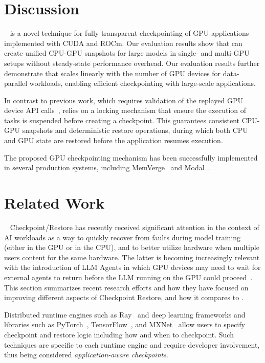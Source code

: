 
\section{Discussion}~\label{sec:discussion}%
\sys is a novel technique for fully transparent checkpointing of GPU applications implemented with CUDA and ROCm. Our evaluation results show that \sys can create unified CPU-GPU snapshots for large models in single- and multi-GPU setups without steady-state performance overhead. Our evaluation results further demonstrate that \sys scales linearly with the number of GPU devices for data-parallel workloads, enabling efficient checkpointing with large-scale applications.

In contrast to previous work, which requires validation of the replayed GPU device API calls~\cite{gupta2024just}, \sys relies on a locking mechanism that ensure the execution of tasks is suspended before creating a checkpoint. This guarantees consistent CPU-GPU snapshots and deterministic restore operations, during which both CPU and GPU state are restored before the application resumes execution.

The proposed GPU checkpointing mechanism has been successfully implemented in several production systems, including MemVerge~\cite{wu2025memory} and Modal~\cite{belotti2025memory}.


\section{Related Work}~\label{sec:related-work}%
Checkpoint/Restore has recently received significant attention in the context of AI workloads as a way to quickly recover from faults during model training (either in the GPU or in the CPU), and to better utilize hardware when multiple users content for the same hardware. The latter is becoming increasingly relevant with the introduction of LLM Agents in which GPU devices may need to wait for external agents to return before the LLM running on the GPU could proceed~\cite{nvidia2023introduction}. This section summarizes recent research efforts and how they have focused on improving different aspects of Checkpoint Restore, and how it compares to \sys.

 Distributed runtime engines such as Ray~\cite{moritz2018ray} and deep learning frameworks and libraries such as PyTorch~\cite{paszke2019pytorch}, TensorFlow~\cite{abadi2016tensorflow}, and MXNet~\cite{chen2015mxnet} allow users to specify checkpoint and restore logic including how and when to checkpoint. Such techniques are specific to each runtime engine and require developer involvement, thus being considered \textit{application-aware checkpoints}.


